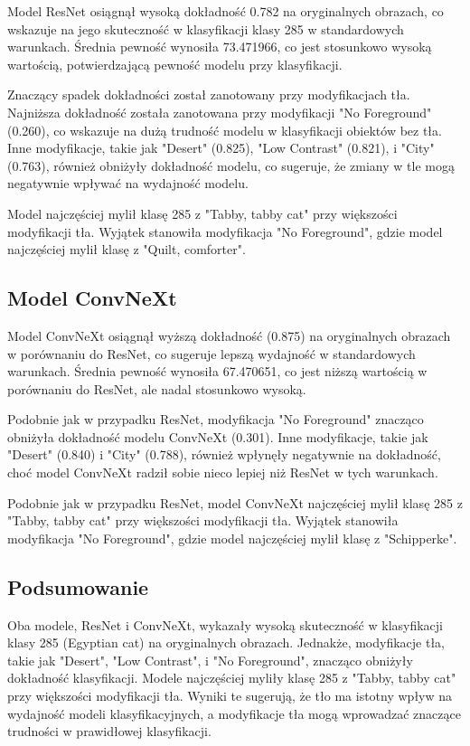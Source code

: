 Model ResNet osiągnął wysoką dokładność 0.782 na oryginalnych obrazach, co wskazuje na jego skuteczność w klasyfikacji klasy 285 w standardowych warunkach. Średnia pewność wynosiła 73.471966, co jest stosunkowo wysoką wartością, potwierdzającą pewność modelu przy klasyfikacji.

Znaczący spadek dokładności został zanotowany przy modyfikacjach tła. Najniższa dokładność została zanotowana przy modyfikacji "No Foreground" (0.260), co wskazuje na dużą trudność modelu w klasyfikacji obiektów bez tła. Inne modyfikacje, takie jak "Desert" (0.825), "Low Contrast" (0.821), i "City" (0.763), również obniżyły dokładność modelu, co sugeruje, że zmiany w tle mogą negatywnie wpływać na wydajność modelu.

Model najczęściej mylił klasę 285 z "Tabby, tabby cat" przy większości modyfikacji tła. Wyjątek stanowiła modyfikacja "No Foreground", gdzie model najczęściej mylił klasę z "Quilt, comforter".

\subsection*{Model ConvNeXt}

Model ConvNeXt osiągnął wyższą dokładność (0.875) na oryginalnych obrazach w porównaniu do ResNet, co sugeruje lepszą wydajność w standardowych warunkach. Średnia pewność wynosiła 67.470651, co jest niższą wartością w porównaniu do ResNet, ale nadal stosunkowo wysoką.

Podobnie jak w przypadku ResNet, modyfikacja "No Foreground" znacząco obniżyła dokładność modelu ConvNeXt (0.301). Inne modyfikacje, takie jak "Desert" (0.840) i "City" (0.788), również wpłynęły negatywnie na dokładność, choć model ConvNeXt radził sobie nieco lepiej niż ResNet w tych warunkach.

Podobnie jak w przypadku ResNet, model ConvNeXt najczęściej mylił klasę 285 z "Tabby, tabby cat" przy większości modyfikacji tła. Wyjątek stanowiła modyfikacja "No Foreground", gdzie model najczęściej mylił klasę z "Schipperke".

\subsection*{Podsumowanie}

Oba modele, ResNet i ConvNeXt, wykazały wysoką skuteczność w klasyfikacji klasy 285 (Egyptian cat) na oryginalnych obrazach. Jednakże, modyfikacje tła, takie jak "Desert", "Low Contrast", i "No Foreground", znacząco obniżyły dokładność klasyfikacji. Modele najczęściej myliły klasę 285 z "Tabby, tabby cat" przy większości modyfikacji tła. Wyniki te sugerują, że tło ma istotny wpływ na wydajność modeli klasyfikacyjnych, a modyfikacje tła mogą wprowadzać znaczące trudności w prawidłowej klasyfikacji.


